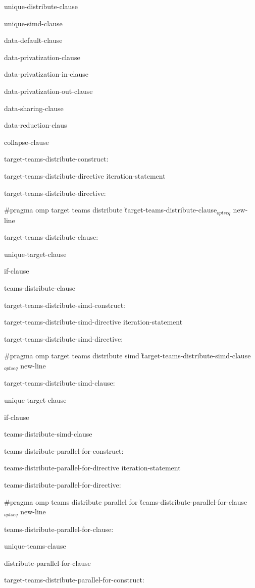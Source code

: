 {\I unique-distribute-clause

\I unique-simd-clause

\I data-default-clause

\I data-privatization-clause

\I data-privatization-in-clause

\I data-privatization-out-clause

\I data-sharing-clause

\I data-reduction-claus

\I collapse-clause

target-teams-distribute-construct:

\I target-teams-distribute-directive iteration-statement

target-teams-distribute-directive:

\C\I \#pragma omp target teams distribute \G target-teams-distribute-clause$_{optseq}$ new-line

target-teams-distribute-clause:

\I unique-target-clause

\I if-clause

\I teams-distribute-clause

target-teams-distribute-simd-construct:

\I target-teams-distribute-simd-directive iteration-statement

target-teams-distribute-simd-directive:

\C \I \#pragma omp target teams distribute simd \G target-teams-distribute-simd-clause$_{optseq}$ new-line

target-teams-distribute-simd-clause:

\I unique-target-clause

\I if-clause

\I teams-distribute-simd-clause

teams-distribute-parallel-for-construct:

\I teams-distribute-parallel-for-directive iteration-statement

teams-distribute-parallel-for-directive:

\C\I \#pragma omp teams distribute parallel for \G teams-distribute-parallel-for-clause$_{optseq}$ new-line

teams-distribute-parallel-for-clause:

\I unique-teams-clause

\I distribute-parallel-for-clause

target-teams-distribute-parallel-for-construct:

}
